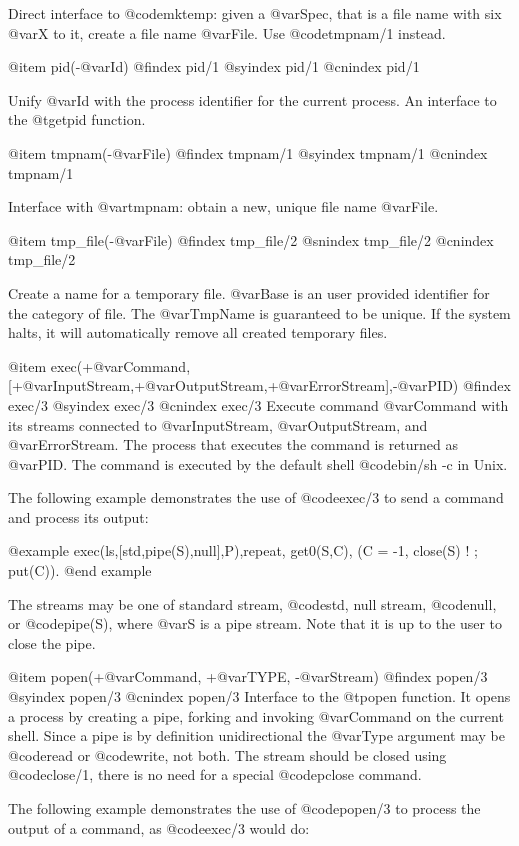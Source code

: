 {{{{{{{{Direct interface to @code{mktemp}: given a @var{Spec}, that is a file
name with six @var{X} to it, create a file name @var{File}. Use
@code{tmpnam/1} instead.

@item pid(-@var{Id})
@findex  pid/1
@syindex pid/1
@cnindex pid/1

Unify @var{Id} with the process identifier for the current
process. An interface to the @t{getpid} function.

@item tmpnam(-@var{File})
@findex  tmpnam/1
@syindex tmpnam/1
@cnindex tmpnam/1

Interface with @var{tmpnam}: obtain a new, unique file name @var{File}.

@item tmp_file(-@var{File})
@findex  tmp_file/2
@snindex tmp_file/2
@cnindex tmp_file/2

Create a name for a temporary file. @var{Base} is an user provided
identifier for the category of file. The @var{TmpName} is guaranteed to
be unique. If the system halts, it will automatically remove all created
temporary files.


@item exec(+@var{Command},[+@var{InputStream},+@var{OutputStream},+@var{ErrorStream}],-@var{PID})
@findex  exec/3
@syindex exec/3
@cnindex exec/3
Execute command @var{Command} with its streams connected to
@var{InputStream}, @var{OutputStream}, and @var{ErrorStream}. The
process that executes the command is returned as @var{PID}. The
command is executed by the default shell @code{bin/sh -c} in Unix.

The following example demonstrates the use of @code{exec/3} to send a
command and process its output:

@example
exec(ls,[std,pipe(S),null],P),repeat, get0(S,C), (C = -1, close(S) ! ; put(C)).
@end example

The streams may be one of standard stream, @code{std}, null stream,
@code{null}, or @code{pipe(S)}, where @var{S} is a pipe stream. Note
that it is up to the user to close the pipe.

@item popen(+@var{Command}, +@var{TYPE}, -@var{Stream})
@findex  popen/3
@syindex popen/3
@cnindex popen/3
Interface to the @t{popen} function. It opens a process by creating a
pipe, forking and invoking @var{Command} on the current shell. Since a
pipe is by definition unidirectional the @var{Type} argument may be
@code{read} or @code{write}, not both. The stream should be closed
using @code{close/1}, there is no need for a special @code{pclose}
command.

The following example demonstrates the use of @code{popen/3} to process
the output of a command, as @code{exec/3} would do:

}}}}}}}}
